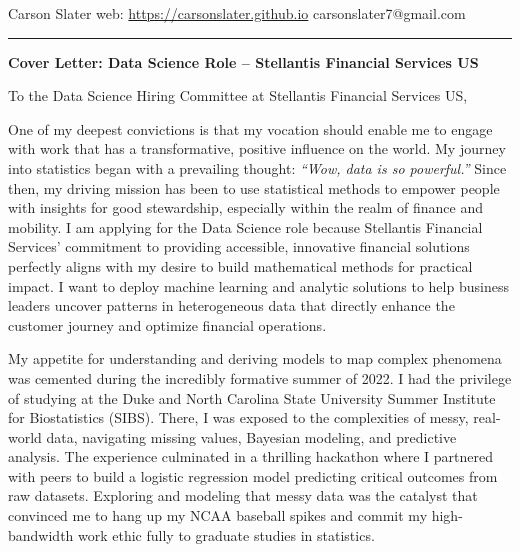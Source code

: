 \documentclass[11pt]{article}
\begin{document}
\noindent
Carson Slater \hfill web: \href{https://carsonslater.github.io}{https://carsonslater.github.io} \hfill carsonslater7@gmail.com \\
\rule{\textwidth}{0.4pt}

\vspace{1em}

\begin{center}
    \Large \textbf{Cover Letter: Data Science Role -- Stellantis Financial Services US}
\end{center}

\vspace{1em}

\noindent
To the Data Science Hiring Committee at Stellantis Financial Services US,

\vspace{0.5em}

One of my deepest convictions is that my vocation should enable me to engage with work that has a transformative, positive influence on the world. My journey into statistics began with a prevailing thought: \textit{``Wow, data is so powerful.''} Since then, my driving mission has been to use statistical methods to empower people with insights for good stewardship, especially within the realm of finance and mobility. I am applying for the Data Science role because Stellantis Financial Services' commitment to providing accessible, innovative financial solutions perfectly aligns with my desire to build mathematical methods for practical impact. I want to deploy machine learning and analytic solutions to help business leaders uncover patterns in heterogeneous data that directly enhance the customer journey and optimize financial operations.

My appetite for understanding and deriving models to map complex phenomena was cemented during the incredibly formative summer of 2022. I had the privilege of studying at the Duke and North Carolina State University Summer Institute for Biostatistics (SIBS). There, I was exposed to the complexities of messy, real-world data, navigating missing values, Bayesian modeling, and predictive analysis. The experience culminated in a thrilling hackathon where I partnered with peers to build a logistic regression model predicting critical outcomes from raw datasets. Exploring and modeling that messy data was the catalyst that convinced me to hang up my NCAA baseball spikes and commit my high-bandwidth work ethic fully to graduate studies in statistics.
\end{document}
